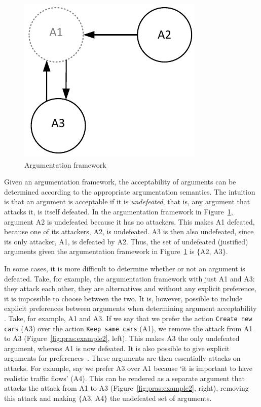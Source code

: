 \begin{figure}[ht]
\centering
\includegraphics[scale=0.8]{img/Fig1}
\caption{Argumentation framework}
\label{fig:pras:example}
\end{figure}

Given an argumentation framework, the acceptability of arguments can be determined according to the appropriate argumentation semantics. The intuition is that an argument is acceptable if it is \emph{undefeated}, that is, any argument that attacks it, is itself defeated. In the argumentation framework in Figure~\ref{fig:pras:example}, argument A2 is undefeated because it has no attackers. This makes A1 defeated, because one of its attackers, A2, is undefeated. A3 is then also undefeated, since its only attacker, A1, is defeated by A2. Thus, the set of undefeated (justified) arguments given the argumentation framework in Figure~\ref{fig:pras:example} is $\{$A2, A3$\}$. 

In some cases, it is more difficult to determine whether or not an argument is defeated. Take, for example, the argumentation framework with just A1 and A3: they attack each other, they are alternatives and without any explicit preference, it is impossible to choose between the two. It is, however, possible to include explicit preferences between arguments when determining argument acceptability \cite{amgoud2002reasoning}. Take, for example, A1 and A3. If we say that we prefer the action  \texttt{Create new cars} (A3) over the action  \texttt{Keep same cars} (A1), we remove the attack from A1 to A3 (Figure~\ref{fig:pras:example2}, left). This makes A3 the only undefeated argument, whereas A1 is now defeated. It is also possible to give explicit arguments for preferences~\cite{modgil2009}. These arguments are then essentially attacks on attacks. For example, say we prefer A3 over A1 because `it is important to have realistic traffic flows' (A4). This can be rendered as a separate argument that attacks the attack from A1 to A3 (Figure~\ref{fig:pras:example2}, right), removing this attack and making $\{$A3, A4$\}$ the undefeated set of arguments. 

